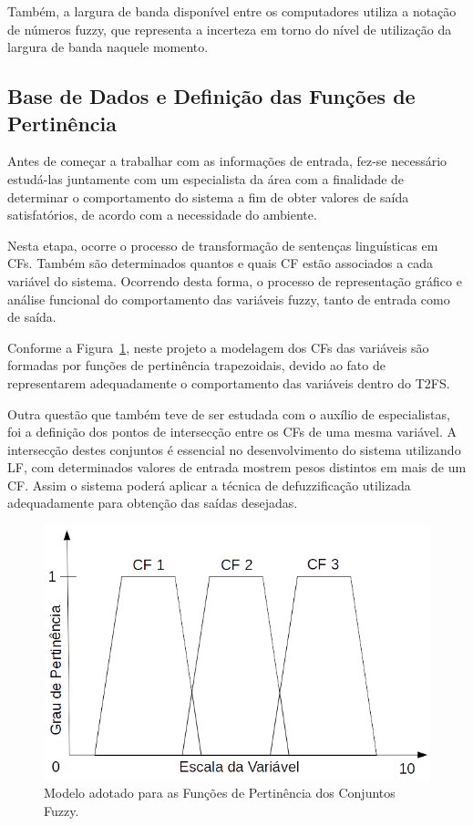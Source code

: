 \documentclass[tcc,capa]{texufpel}
\begin{document}
Também, a largura de banda disponível entre os computadores utiliza a notação de números fuzzy, que representa a incerteza em torno do nível de utilização da largura de banda naquele momento. 
 

\subsection{Base de Dados e Definição das Funções de Pertinência}

Antes de começar a trabalhar com as informações de entrada, fez-se necessário estudá-las juntamente com um especialista da área com a finalidade de determinar o comportamento do sistema a fim de obter valores de saída satisfatórios, de acordo com a necessidade do ambiente.

Nesta etapa, ocorre o processo de transformação de sentenças linguísticas em CFs. Também são determinados quantos e quais CF estão associados a cada variável do sistema. Ocorrendo desta forma, o processo de representação gráfico e análise funcional do comportamento das variáveis fuzzy, tanto de entrada como de saída.

Conforme a Figura~\ref{funcoes_pertinencia_modelagem}, neste projeto a modelagem dos CFs das variáveis são formadas por funções de pertinência trapezoidais, devido ao fato de representarem adequadamente o comportamento das variáveis dentro do T2FS.

Outra questão que também teve de ser estudada com o auxílio de especialistas, foi a definição dos pontos de intersecção entre os CFs de uma mesma variável. A intersecção destes conjuntos é essencial no desenvolvimento do sistema utilizando LF, com determinados valores de entrada mostrem pesos distintos em mais de um CF. Assim o sistema poderá aplicar a técnica de defuzzificação utilizada adequadamente para obtenção das saídas desejadas.

\begin{figure}[h]
	\centering
	\includegraphics[scale=0.5]{images/funcoes_pertinencia_modelagem_trapmf.png}
	\caption{Modelo adotado para as Funções de Pertinência dos Conjuntos Fuzzy.}
	\label{funcoes_pertinencia_modelagem}
\end{figure}
\end{document}
